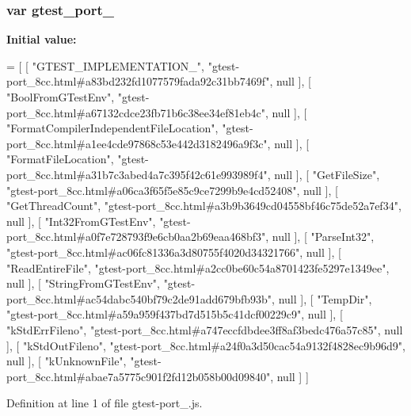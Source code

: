 \subsubsection[{\texorpdfstring{gtest\+\_\+port\+\_\+8cc}{gtest_port_8cc}}]{\setlength{\rightskip}{0pt plus 5cm}var gtest\+\_\+port\+\_}\hypertarget{gtest-port__8cc_8js_a5e322789499e5dcf0fce41e776efd0d0}{}\label{gtest-port__8cc_8js_a5e322789499e5dcf0fce41e776efd0d0}
{\bfseries Initial value\+:}
\begin{DoxyCode}
=
[
    [ \textcolor{stringliteral}{"GTEST\_IMPLEMENTATION\_"}, \textcolor{stringliteral}{"gtest-port\_8cc.html#a83bd232fd1077579fada92c31bb7469f"}, null ],
    [ \textcolor{stringliteral}{"BoolFromGTestEnv"}, \textcolor{stringliteral}{"gtest-port\_8cc.html#a67132cdce23fb71b6c38ee34ef81eb4c"}, null ],
    [ \textcolor{stringliteral}{"FormatCompilerIndependentFileLocation"}, \textcolor{stringliteral}{"gtest-port\_8cc.html#a1ee4cde97868c53e442d3182496a9f3c"}, 
      null ],
    [ \textcolor{stringliteral}{"FormatFileLocation"}, \textcolor{stringliteral}{"gtest-port\_8cc.html#a31b7c3abed4a7c395f42c61e993989f4"}, null ],
    [ \textcolor{stringliteral}{"GetFileSize"}, \textcolor{stringliteral}{"gtest-port\_8cc.html#a06ca3f65f5e85c9ce7299b9e4cd52408"}, null ],
    [ \textcolor{stringliteral}{"GetThreadCount"}, \textcolor{stringliteral}{"gtest-port\_8cc.html#a3b9b3649cd04558bf46c75de52a7ef34"}, null ],
    [ \textcolor{stringliteral}{"Int32FromGTestEnv"}, \textcolor{stringliteral}{"gtest-port\_8cc.html#a0f7e728793f9e6cb0aa2b69eaa468bf3"}, null ],
    [ \textcolor{stringliteral}{"ParseInt32"}, \textcolor{stringliteral}{"gtest-port\_8cc.html#ac06fc81336a3d80755f4020d34321766"}, null ],
    [ \textcolor{stringliteral}{"ReadEntireFile"}, \textcolor{stringliteral}{"gtest-port\_8cc.html#a2cc0be60c54a8701423fe5297e1349ee"}, null ],
    [ \textcolor{stringliteral}{"StringFromGTestEnv"}, \textcolor{stringliteral}{"gtest-port\_8cc.html#ac54dabc540bf79c2de91add679bfb93b"}, null ],
    [ \textcolor{stringliteral}{"TempDir"}, \textcolor{stringliteral}{"gtest-port\_8cc.html#a59a959f437bd7d515b5c41dcf00229c9"}, null ],
    [ \textcolor{stringliteral}{"kStdErrFileno"}, \textcolor{stringliteral}{"gtest-port\_8cc.html#a747eccfdbdee3ff8af3bedc476a57c85"}, null ],
    [ \textcolor{stringliteral}{"kStdOutFileno"}, \textcolor{stringliteral}{"gtest-port\_8cc.html#a24f0a3d50cac54a9132f4828ec9b96d9"}, null ],
    [ \textcolor{stringliteral}{"kUnknownFile"}, \textcolor{stringliteral}{"gtest-port\_8cc.html#abae7a5775c901f2fd12b058b00d09840"}, null ]
]
\end{DoxyCode}


Definition at line 1 of file gtest-\/port\+\_.\+js.

